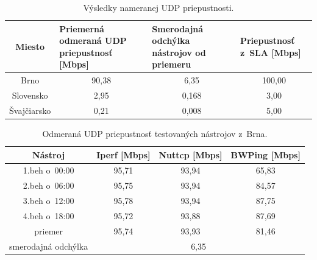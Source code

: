         \begin{table}[h!]
            \begin{center}
                \begin{tabular}{|c|m{4.3cm}|m{4cm}|m{3.4cm}|}
                    \hline
                    Miesto & Priemerná odmeraná UDP priepustnosť [Mbps] &
                    Smerodajná odchýlka nástrojov od priemeru &
                    Priepustnosť z~SLA [Mbps] \\  
                    \hline
                    Brno        &  \multicolumn{1}{c}{90,38} & 
                        \multicolumn{1}{|c|}{6,35} & \multicolumn{1}{c|}{100,00} \\
                    \hline
                    Slovensko   &  \multicolumn{1}{c}{2,95} & 
                        \multicolumn{1}{|c|}{0,168} & \multicolumn{1}{c|}{3,00} \\
                    \hline
                    Švajčiarsko &  \multicolumn{1}{c}{0,21} & 
                        \multicolumn{1}{|c|}{0,008} & \multicolumn{1}{c|}{5,00}\\
                    \hline
                \end{tabular}
                \caption{Výsledky nameranej UDP priepustnosti.} 
                \label{vys_udp_priep}
            \end{center}
        \end{table}
    \begin{table}[h!]
        \begin{center}
            \begin{tabular}{|c|c|c|c|}
                \hline
                Nástroj & Iperf [Mbps]&
                    Nuttcp [Mbps] & BWPing [Mbps] \\ 
                \hline
                1.beh o~00:00 & 95,71 & 93,94 & 65,83 \\
                \hline
                2.beh o~06:00 & 95,75 & 93,94 & 84,57 \\
                \hline
                3.beh o~12:00 & 95,78 & 93,94 & 87,75 \\
                \hline
                4.beh o~18:00 & 95,72 & 93,88 & 87,69 \\
                \hline
                priemer & 95,74 & 93,93 & 81,46 \\
                \hline
                smerodajná odchýlka & \multicolumn{3}{c|}{6,35} \\
                \hline
            \end{tabular}
            \caption{Odmeraná UDP priepustnosť testovaných nástrojov z~Brna.} 
            \label{tab_test_udp}
        \end{center}
    \end{table}
